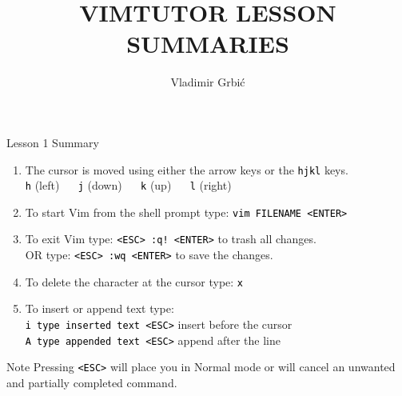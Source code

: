 \documentclass[handout, 10pt]{beamer}
\title{VIMTUTOR LESSON SUMMARIES}
\author{Vladimir Grbić}
\institute{\href{https://vladimirgrbic.com}{vladimirgrbic.com}}
\date{} %
\newcommand{\code}[2][black]{\textcolor{#1}{\colorbox{codegray}{\texttt{#2}}}}
\begin{document}
\begin{frame}
	\titlepage
\end{frame}

\begin{frame}{Lesson 1 Summary}
	\begin{enumerate}
		\item The cursor is moved using either the arrow keys or the
			\code{hjkl} keys. \\
			\code{h} (left) $ \quad $ \code{j} (down) $ \quad $ \code{k} (up) $
			\quad $ \code{l} (right)

		\item To start Vim from the shell prompt type: \code{vim FILENAME
			<ENTER>}

		\item To exit Vim type: \code{<ESC> :q! <ENTER>} to trash all
			changes. \\
			OR type: \code{<ESC> :wq <ENTER>} to save the changes.

		\item To delete the character at the cursor type: \code{x}

		\item To insert or append text type: \\
			\code{i type inserted text <ESC>} insert before the cursor \\
			\code{A type appended text <ESC>} append after the line
	\end{enumerate}

	\begin{block}{Note}
		Pressing \code{<ESC>} will place you in Normal mode or will cancel an
		unwanted and partially completed command.
	\end{block}
\end{frame}
\end{document}
